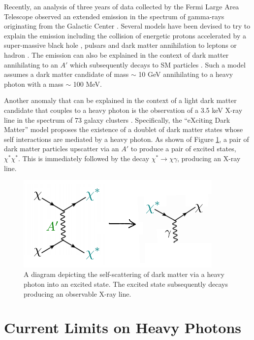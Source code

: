 Recently, an analysis of three years of data collected by the Fermi Large Area
Telescope observed an extended emission in the spectrum of gamma-rays 
originating from the Galactic Center 
\cite{hooper2011, linden2011, abazajian2012, hooper2013}.  Several models have been 
devised to try to explain the emission including the collision of energetic 
protons accelerated by a super-massive black hole \cite{Hooper:2010mq}, 
pulsars \cite{Abazajian:2010zy} and dark matter annihilation to leptons or 
hadron \cite{Hooper:2010mq, Goodenough:2009gk}.  The emission can also
be explained in the context of dark matter annihilating to an $A'$ which 
subsequently decays to SM particles \cite{Hooper:2012cw}.  Such a model assumes
a dark matter candidate of mass $\sim$ 10 GeV annihilating to a heavy photon
with a mass $\sim$ 100 MeV. 

Another anomaly that can be explained in the context of a light dark matter
candidate that couples to a heavy photon is the observation
of a 3.5 keV X-ray line in the spectrum of 73 galaxy clusters \cite{Bulbul:2014sua}.  
Specifically, the ``eXciting Dark Matter'' model \cite{Finkbeiner:2014sja} 
proposes the existence of a doublet of dark matter states whose self interactions are 
mediated by a heavy photon. As shown of Figure \ref{fig:dm_self_scat}, a pair
of dark matter particles upscatter via an $A'$ to produce a pair of excited states, 
$\chi^*\chi^*$. This is immediately followed by the decay 
$\chi^* \rightarrow  \chi\gamma$, producing an X-ray line.
\begin{figure}[t]
    \centering
    \includegraphics[width=0.9\textwidth]{images/xdm.png}
    \caption{A diagram depicting the self-scattering of dark matter via a heavy
             photon into an excited state. The excited state subsequently decays
             producing an observable X-ray line.}
    \label{fig:dm_self_scat}
\end{figure}


\section{Current Limits on Heavy Photons} \label{sec:current_limits}

